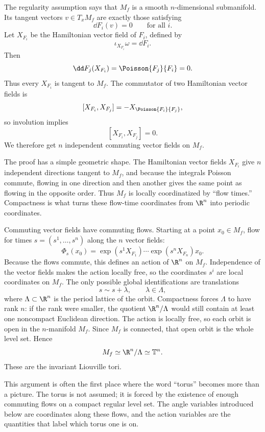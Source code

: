 The regularity assumption says that \(M_f\) is a smooth \(n\)-dimensional
submanifold. Its tangent vectors \(v\in T_xM_f\) are exactly those satisfying
\[
  \dd F_i(v)=0
  \qquad\text{for all }i.
\]
Let \(X_{F_i}\) be the Hamiltonian vector field of \(F_i\), defined by
\[
  \iota_{X_{F_i}}\omega=\dd F_i.
\]
Then
\[
  \dd F_j(X_{F_i})
  =
  \Poisson{F_j}{F_i}
  =
  0.
\]
Thus every \(X_{F_i}\) is tangent to \(M_f\). The commutator of two Hamiltonian
vector fields is
\[
  [X_{F_i},X_{F_j}]
  =
  -X_{\Poisson{F_i}{F_j}},
\]
so involution implies
\[
  [X_{F_i},X_{F_j}]=0.
\]
We therefore get \(n\) independent commuting vector fields on \(M_f\).

\begin{derivation}
The proof has a simple geometric shape. The Hamiltonian vector fields
\(X_{F_i}\) give \(n\) independent directions tangent to \(M_f\), and because
the integrals Poisson commute, flowing in one direction and then another gives
the same point as flowing in the opposite order. Thus \(M_f\) is locally
coordinatized by ``flow times.'' Compactness is what turns these flow-time
coordinates from \(\R^n\) into periodic coordinates.

Commuting vector fields have commuting flows. Starting at a point \(x_0\in
M_f\), flow for times \(s=(s^1,\ldots,s^n)\) along the \(n\) vector fields:
\[
  \Phi_s(x_0)
  =
  \exp(s^1X_{F_1})\cdots\exp(s^nX_{F_n})x_0.
\]
Because the flows commute, this defines an action of \(\R^n\) on \(M_f\).
Independence of the vector fields makes the action locally free, so the
coordinates \(s^i\) are local coordinates on \(M_f\). The only possible global
identifications are translations
\[
  s\sim s+\lambda,\qquad \lambda\in\Lambda,
\]
where \(\Lambda\subset\R^n\) is the period lattice of the orbit. Compactness
forces \(\Lambda\) to have rank \(n\): if the rank were smaller, the quotient
\(\R^n/\Lambda\) would still contain at least one noncompact Euclidean
direction. The action is locally free, so each orbit is open in the
\(n\)-manifold \(M_f\). Since \(M_f\) is connected, that open orbit is the
whole level set. Hence
\[
  M_f\simeq \R^n/\Lambda\simeq \mathbb T^n.
\]
These are the invariant Liouville tori.
\end{derivation}

This argument is often the first place where the word ``torus'' becomes more
than a picture. The torus is not assumed; it is forced by the existence of
enough commuting flows on a compact regular level set. The angle variables
introduced below are coordinates along these flows, and the action variables
are the quantities that label which torus one is on.

